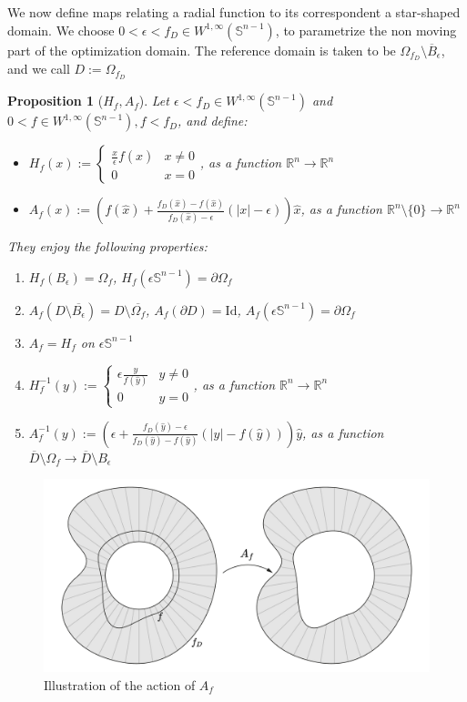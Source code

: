 \documentclass[english,a4paper,9pt,oneside]{scrbook}	%
\theoremstyle{break}
\newtheorem{prop}[equation]{Proposition}
\theoremstyle{remark}
\newcommand{\mR}{\mathbb{R}}
\newcommand{\mS}{\mathbb{S}^{n-1}}
\newcommand{\ds}{\displaystyle}
\newcommand{\id}{\text{Id}}
\newcommand{\xh}{\hat{x}}
\newcommand{\yh}{\hat{y}}
\newcommand{\eps}{\epsilon}
\begin{document}
We now define maps relating a radial function to its correspondent a star-shaped domain. We choose $0<\eps <f_D \in W^{1,\infty}(\mS)$, to parametrize the non moving part of the optimization domain. The reference domain is taken to be $\Omega_{f_D}\setminus \overline{B}_\eps$, and we call $D:=\Omega_{f_D}$

\begin{prop}[$H_f, A_f$]
Let $\eps <f_D \in W^{1,\infty}(\mS)$ and $0<f \in W^{1,\infty}(\mS), f<f_D$, and define:
\begin{itemize}
	\item $H_f(x):=\ds \left\{\begin{matrix}
\frac{x}{\epsilon}f(\hat{x}) &  x\neq 0\\ 
0 & x=0
\end{matrix}\right. $, as a function $\mR^n\rightarrow \mR^n$
	\item $A_f(x):=\left (  f(\xh)+\frac{f_D(\xh)-f(\xh)}{f_D(\xh)-\eps}(|x|-\eps) \right )\xh$, as a function $\mR^n\setminus\{0\}\rightarrow \mR^n$
\end{itemize}

They enjoy the following properties:

\begin{enumerate}
	\item $H_f(B_\eps)=\Omega_f$, $H_f(\eps \mS) = \partial \Omega_f$
	\item $A_f(D\setminus \overline{B_\eps}) = D\setminus \overline{\Omega_f}$, $A_f(\partial D) = \id$, $A_f(\eps \mS) = \partial \Omega_f$
	\item $A_f=H_f$ on $\eps\mS$
	\item $H_f^{-1}(y):=\ds \left\{\begin{matrix}
\epsilon \frac{y}{f(\hat{y})} &  y\neq 0\\ 
0 & y=0
\end{matrix}\right. $, as a function $\mR^n\rightarrow \mR^n$
	\item $A_f^{-1}(y):=\left (  \eps+\frac{f_D(\yh)-\eps}{f_D(\yh)-f(\yh)}(|y|-f(\yh)) \right )\yh$, as a function $\overline{D}\setminus \Omega_f \rightarrow \overline{D}\setminus B_\eps$
\end{enumerate}

\end{prop}


\begin{figure}[H]
\centering
\includegraphics[width=0.7\columnwidth]{Images/A_f.pdf}
\caption{Illustration of the action of $A_f$}\label{fig:A_f}
\end{figure}
\end{document}
